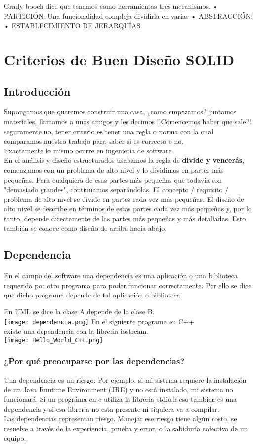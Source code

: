 \documentclass[12pt]{book}
\begin{document}
Grady booch dice que tenemos como herramientas tres mecanismos.
    • PARTICIÓN: Una funcionalidad compleja dividirla en varias 
    • ABSTRACCIÓN: 
    • ESTABLECIMIENTO DE JERARQUÍAS

\chapter{Criterios de Buen Diseño SOLID}
\section{Introducci\'on} Supongamos que queremos construir una casa, ¿como empezamos? juntamos materiales, llamamos a unos amigos y les decimos !!Comencemos haber que sale!!! seguramente no, tener criterio es tener una regla o norma con la cual comparamos nuestro trabajo para saber si es correcto o no.
\\
Exactamente lo mismo ocurre en ingenier\'ia de software.
\\
En el análisis y diseño estructurados usabamos la regla de \textbf{divide y vencer\'as}, comenzamos con un problema de alto nivel y lo dividimos en partes más pequeñas. Para cualquiera de esas partes más pequeñas que todavía son "demasiado grandes", continuamos separándolas. El concepto / requisito / problema de alto nivel se divide en partes cada vez más pequeñas. El diseño de alto nivel se describe en términos de estas partes cada vez más pequeñas y, por lo tanto, depende directamente de las partes más pequeñas y más detalladas. Esto también se conoce como diseño de arriba hacia abajo.
\section{Dependencia} En el campo del software una dependencia es una aplicación o una biblioteca requerida por otro programa para poder funcionar correctamente. Por ello se dice que dicho programa depende de tal aplicación o biblioteca.

\begin {center}
En UML se dice la clase A depende de la clase B.\\
\texttt{[image: dependencia.png]}
En el siguiente programa en C++ \\existe una dependencia con la libreria iostream.\\
\texttt{[image: Hello\_World\_C++.png]}
\end{center}


\subsection{¿Por qué preocuparse por las dependencias?}
Una dependencia es un riesgo. Por ejemplo, si mi sistema requiere la instalación de un Java Runtime Environment (JRE) y no está instalado, mi sistema no funcionará, Si un progr\'ama en c utiliza la libreria stdio.h eso tambien es una dependencia y si esa libreria no esta presente ni siquiera va a compilar.
\\
Las dependencias representan riesgo. Manejar ese riesgo tiene algún costo. se resuelve a través de la experiencia, prueba y error, o la sabiduría colectiva de un equipo.
\end{document}
